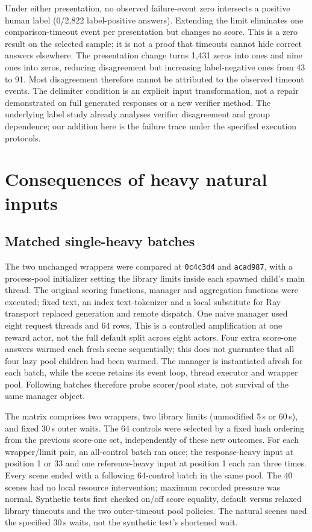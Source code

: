 \documentclass[10pt,a4paper]{article}
\begin{document}
Under either presentation, no observed failure-event zero intersects a
positive human label (0/2,822 label-positive answers). Extending the limit
eliminates one comparison-timeout event per presentation but changes no
score. This is a zero result on the selected sample; it is not a proof that
timeouts cannot hide correct answers elsewhere. The presentation change
turns 1,431 zeros into ones and nine ones into zeros, reducing disagreement
but increasing label-negative ones from 43 to 91. Most disagreement
therefore cannot be attributed to the observed timeout events. The delimiter
condition is an explicit input transformation, not a repair demonstrated
on full generated responses or a new verifier method. The underlying label
study already analyses verifier disagreement and group dependence; our
addition here is the failure trace under the specified execution protocols.

\section{Consequences of heavy natural inputs}
\label{sec:consequences}
\subsection{Matched single-heavy batches}

The two unchanged wrappers were compared at \texttt{0c4c3d4} and
\texttt{acad987}, with a process-pool initializer setting the library limits
inside each spawned child's main thread. The original scoring functions,
manager and aggregation functions were executed; fixed text, an index
text-tokenizer and a local substitute for Ray transport replaced generation
and remote dispatch. One naive manager used eight request threads and
64 rows. This is a controlled amplification at one reward actor, not the
full default split across eight actors. Four extra score-one answers warmed
each fresh scene sequentially; this does not guarantee that all four lazy
pool children had been warmed.
The manager is instantiated afresh for each batch, while the scene retains
its event loop, thread executor and wrapper pool. Following batches therefore
probe scorer/pool state, not survival of the same manager object.

The matrix comprises two wrappers, two library limits (unmodified 5\,s or
60\,s), and fixed 30\,s outer waits. The 64 controls were selected by a
fixed hash ordering from the previous score-one set, independently of these
new outcomes. For each wrapper/limit pair, an all-control batch ran once;
the response-heavy input at position 1 or 33 and one reference-heavy
input at position 1 each ran three times. Every scene ended with a following
64-control batch in the same pool. The 40 scenes had no local resource
intervention; maximum recorded pressure was normal. Synthetic tests first
checked on/off score equality, default versus relaxed library timeouts and
the two outer-timeout pool policies. The natural scenes used the specified
30\,s waits, not the synthetic test's shortened wait.
\end{document}
